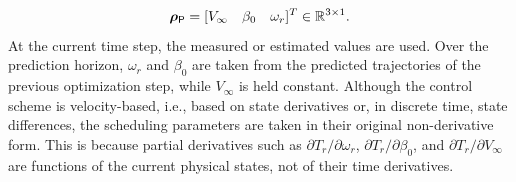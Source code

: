 \begin{equation} \label{eq:rhoWT4}
    \bm{\rho}_{\mathsf{P}} = [V_{\infty} \quad \beta_0 \quad \omega_{r}]^T \in \mathbb{R}^{3 \times 1}.
\end{equation}
At the current time step, the measured or estimated values are used. Over the prediction horizon, $\omega_r$ and $\beta_0$ are taken from the predicted trajectories of the previous optimization step, while $V_{\infty}$ is held constant. Although the control scheme is velocity-based, i.e., based on state derivatives or, in discrete time, state differences, the scheduling parameters are taken in their original non-derivative form. This is because partial derivatives such as \( \partial T_r / \partial \omega_r \), \( \partial T_r / \partial \beta_0 \), and \( \partial T_r / \partial V_{\infty} \) are functions of the current physical states, not of their time derivatives.

